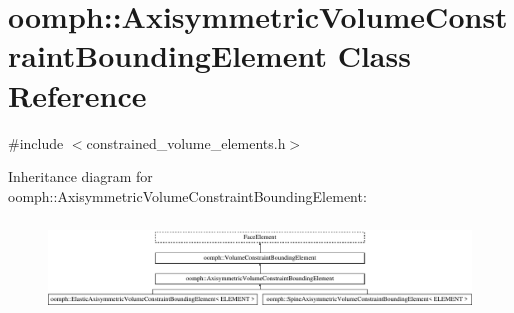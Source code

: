 \hypertarget{classoomph_1_1AxisymmetricVolumeConstraintBoundingElement}{}\section{oomph\+:\+:Axisymmetric\+Volume\+Constraint\+Bounding\+Element Class Reference}
\label{classoomph_1_1AxisymmetricVolumeConstraintBoundingElement}


{\ttfamily \#include $<$constrained\+\_\+volume\+\_\+elements.\+h$>$}

Inheritance diagram for oomph\+:\+:Axisymmetric\+Volume\+Constraint\+Bounding\+Element\+:\begin{figure}[H]
\begin{center}
\leavevmode
\includegraphics[height=2.477876cm]{classoomph_1_1AxisymmetricVolumeConstraintBoundingElement}
\end{center}
\end{figure}
